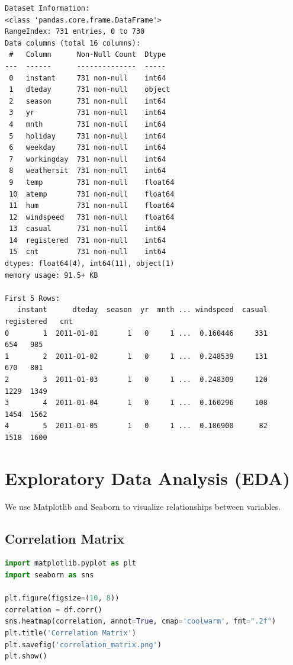 \documentclass[12pt, a4paper]{article}
\begin{document}
\begin{verbatim}
Dataset Information:
<class 'pandas.core.frame.DataFrame'>
RangeIndex: 731 entries, 0 to 730
Data columns (total 16 columns):
 #   Column      Non-Null Count  Dtype  
---  ------      --------------  -----  
 0   instant     731 non-null    int64  
 1   dteday      731 non-null    object 
 2   season      731 non-null    int64  
 3   yr          731 non-null    int64  
 4   mnth        731 non-null    int64  
 5   holiday     731 non-null    int64  
 6   weekday     731 non-null    int64  
 7   workingday  731 non-null    int64  
 8   weathersit  731 non-null    int64  
 9   temp        731 non-null    float64
 10  atemp       731 non-null    float64
 11  hum         731 non-null    float64
 12  windspeed   731 non-null    float64
 13  casual      731 non-null    int64  
 14  registered  731 non-null    int64  
 15  cnt         731 non-null    int64  
dtypes: float64(4), int64(11), object(1)
memory usage: 91.5+ KB

First 5 Rows:
   instant      dteday  season  yr  mnth ... windspeed  casual  registered   cnt
0        1  2011-01-01       1   0     1 ...  0.160446     331         654   985
1        2  2011-01-02       1   0     1 ...  0.248539     131         670   801
2        3  2011-01-03       1   0     1 ...  0.248309     120        1229  1349
3        4  2011-01-04       1   0     1 ...  0.160296     108        1454  1562
4        5  2011-01-05       1   0     1 ...  0.186900      82        1518  1600
\end{verbatim}

\section{Exploratory Data Analysis (EDA)}
We use Matplotlib and Seaborn to visualize relationships between variables.

\subsection{Correlation Matrix}
\begin{lstlisting}[language=Python, caption=Generating Correlation Matrix]
import matplotlib.pyplot as plt
import seaborn as sns

plt.figure(figsize=(10, 8))
correlation = df.corr()
sns.heatmap(correlation, annot=True, cmap='coolwarm', fmt=".2f")
plt.title('Correlation Matrix')
plt.savefig('correlation_matrix.png')
plt.show()
\end{lstlisting}
\end{document}
